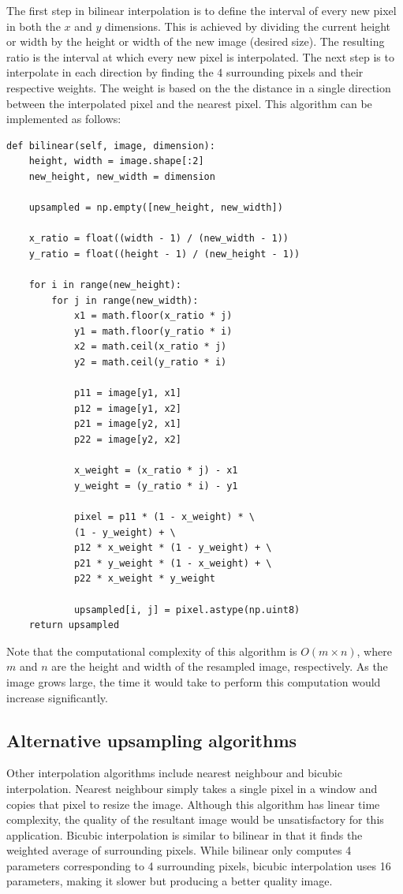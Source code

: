 \documentclass[10pt,twocolumn,letterpaper]{article}
\begin{document}
The first step in bilinear interpolation is to define the interval of every new pixel in both the $x$ and $y$ dimensions. This is achieved by dividing the current height or width by the height or width of the new image (desired size). The resulting ratio is the interval at which every new pixel is interpolated. The next step is to interpolate in each direction by finding the 4 surrounding pixels and their respective weights. The weight is based on the the distance in a single direction between the interpolated pixel and the nearest pixel. This algorithm can be implemented as follows:
{\footnotesize
\begin{verbatim}
def bilinear(self, image, dimension):
    height, width = image.shape[:2]
    new_height, new_width = dimension

    upsampled = np.empty([new_height, new_width])

    x_ratio = float((width - 1) / (new_width - 1))
    y_ratio = float((height - 1) / (new_height - 1))

    for i in range(new_height):
        for j in range(new_width):
            x1 = math.floor(x_ratio * j)
            y1 = math.floor(y_ratio * i)
            x2 = math.ceil(x_ratio * j)
            y2 = math.ceil(y_ratio * i)

            p11 = image[y1, x1]
            p12 = image[y1, x2]
            p21 = image[y2, x1]
            p22 = image[y2, x2]

            x_weight = (x_ratio * j) - x1
            y_weight = (y_ratio * i) - y1

            pixel = p11 * (1 - x_weight) * \ 
            (1 - y_weight) + \
            p12 * x_weight * (1 - y_weight) + \
            p21 * y_weight * (1 - x_weight) + \
            p22 * x_weight * y_weight

            upsampled[i, j] = pixel.astype(np.uint8)
    return upsampled
\end{verbatim}
}
Note that the computational complexity of this algorithm is $O(m\times n)$, where $m$ and $n$ are the height and width of the resampled image, respectively. As the image grows large, the time it would take to perform this computation would increase significantly.
\subsection{Alternative upsampling algorithms}
Other interpolation algorithms include nearest neighbour and bicubic interpolation. Nearest neighbour simply takes a single pixel in a window and copies that pixel to resize the image. Although this algorithm has linear time complexity, the quality of the resultant image would be unsatisfactory for this application. Bicubic interpolation is similar to bilinear in that it finds the weighted average of surrounding pixels. While bilinear only computes 4 parameters corresponding to 4 surrounding pixels, bicubic interpolation uses 16 parameters, making it slower but producing a better quality image.
\end{document}
